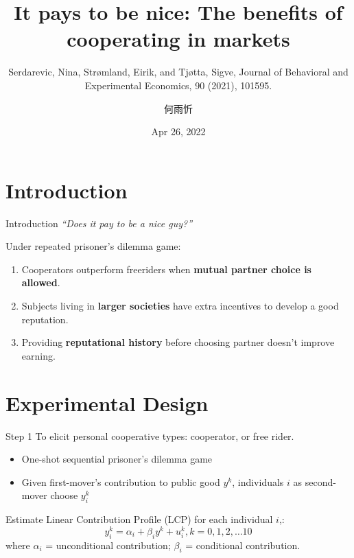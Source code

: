\documentclass[
  10pt,
  ignorenonframetext,
  aspectratio=43,
]{beamer}
\title{It pays to be nice: The benefits of cooperating in markets}
\subtitle{Serdarevic, Nina, Strømland, Eirik, and Tjøtta, Sigve, Journal
of Behavioral and Experimental Economics, 90 (2021), 101595.}
\author{何雨忻}
\date{Apr 26, 2022}
\institute{Department of Economics, National Taiwan University}
\providecommand{\tightlist}{%
  \setlength{\itemsep}{0pt}\setlength{\parskip}{0pt}}
\begin{document}
\frame{\titlepage}

\begin{frame}
  \tableofcontents[hideallsubsections]
\end{frame}
\hypertarget{introduction}{%
\section{Introduction}\label{introduction}}

\begin{frame}{Introduction}
\emph{``Does it pay to be a nice guy?''}

Under repeated prisoner's dilemma game:

\begin{enumerate}
\tightlist
\item
  Cooperators outperform freeriders when \textbf{mutual partner choice
  is allowed}.
\item
  Subjects living in \textbf{larger societies} have extra incentives to
  develop a good reputation.
\item
  Providing \textbf{reputational history} before choosing partner
  doesn't improve earning.
\end{enumerate}
\end{frame}

\hypertarget{experimental-design}{%
\section{Experimental Design}\label{experimental-design}}

\begin{frame}{Step 1}
\protect\hypertarget{step-1}{}
To elicit personal cooperative types: cooperator, or free rider.

\begin{itemize}
\tightlist
\item
  One-shot sequential prisoner's dilemma game
\item
  Given first-mover's contribution to public good \(y^k\), individuals
  \(i\) as second-mover choose \(y^k_i\)
\end{itemize}

Estimate Linear Contribution Profile (LCP) for each individual \(i\),:
\[
y^k_i = \alpha_i + \beta_i y^k + u^k_i, k=0,1,2,\dots 10
\] where \(\alpha_i\) = unconditional contribution; \(\beta_i\) =
conditional contribution.
\end{frame}
\end{document}
